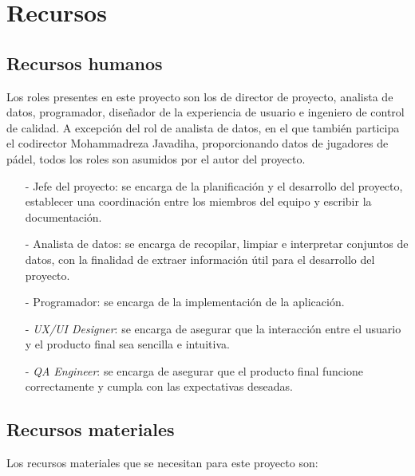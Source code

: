 \newpage

\section{Recursos}

\subsection{Recursos humanos}

Los roles presentes en este proyecto son los de director de proyecto, analista de datos, programador, diseñador de la experiencia de usuario e ingeniero de control de calidad. A excepción del rol de analista de datos, en el que también participa el codirector Mohammadreza Javadiha, proporcionando datos de jugadores de pádel, todos los roles son asumidos por el autor del proyecto.

\begin{enumerate}
    \item[-] Jefe del proyecto: se encarga de la planificación y el desarrollo del proyecto, establecer una coordinación entre los miembros del equipo y escribir la documentación.
    \item[-] Analista de datos: se encarga de recopilar, limpiar e interpretar conjuntos de datos, con la finalidad de extraer información útil para el desarrollo del proyecto.
    \item[-] Programador: se encarga de la implementación de la aplicación.
    \item[-] \emph{UX/UI Designer}: se encarga de asegurar que la interacción entre el usuario y el producto final sea sencilla e intuitiva.
    \item[-] \emph{QA Engineer}: se encarga de asegurar que el producto final funcione correctamente y cumpla con las expectativas deseadas.
\end{enumerate}

\subsection{Recursos materiales}

Los recursos materiales que se necesitan para este proyecto son:

